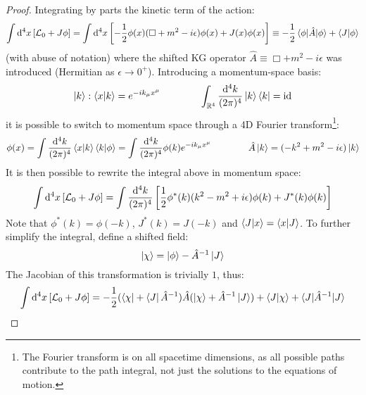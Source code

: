 \begin{proofbox}
  \begin{proof}
    Integrating by parts the kinetic term of the action:
    \begin{equation*}
      \int \mathrm{d}^4x \left[ \mathcal{L}_0 + J \phi \right] = \int \mathrm{d}^4x \left[ - \frac{1}{2} \phi(x) (\Box + m^2 - i\epsilon) \phi(x) + J(x) \phi(x) \right] \equiv - \frac{1}{2} \braket{\phi | \hat{A} | \phi} + \braket{J | \phi}
    \end{equation*}
    (with abuse of notation) where the shifted KG operator $ \hat{A} \equiv \Box + m^2 - i\epsilon $ was introduced (Hermitian as $ \epsilon \rightarrow 0^+ $). Introducing a momentum-space basis:
    \begin{equation}
      \ket{k} : \braket{x | k} = e^{-i k_\mu x^\mu}
      \qquad \qquad
      \int_{\mathbb{R}^4} \frac{\mathrm{d}^4k}{(2\pi)^4} \ket{k} \bra{k} = \operatorname{id}
    \end{equation}
    it is possible to switch to momentum space through a 4D Fourier transform\footnote{The Fourier transform is on all spacetime dimensions, as all possible paths contribute to the path integral, not just the solutions to the equations of motion.}:
    \begin{equation*}
      \phi(x) = \int \frac{\mathrm{d}^4k}{(2\pi)^4} \braket{x | k} \braket{k | \phi} = \int \frac{\mathrm{d}^4k}{(2\pi)^4} \phi(k) e^{-i k_\mu x^\mu}
      \qquad \qquad
      \hat{A} \ket{k} = (-k^2 + m^2 - i\epsilon) \ket{k}
    \end{equation*}
    It is then possible to rewrite the integral above in momentum space:
    \begin{equation*}
      \int \mathrm{d}^4x \left[ \mathcal{L}_0 + J \phi \right] = \int \frac{\mathrm{d}^4k}{(2\pi)^4} \left[ \frac{1}{2} \phi^*(k) (k^2 - m^2 + i\epsilon) \phi(k) + J^*(k) \phi(k) \right]
    \end{equation*}
    Note that $ \phi^*(k) = \phi(-k) $, $ J^*(k) = J(-k) $ and $ \braket{J|x} = \braket{x|J} $. To further simplify the integral, define a shifted field:
    \begin{equation*}
      \ket{\chi} = \ket{\phi} - \hat{A}^{-1} \ket{J}
    \end{equation*}
    The Jacobian of this transformation is trivially $ 1 $, thus:
    \begin{equation*}
      \begin{split}
        \int \dd^4x \left[ \lag_0 + J\phi \right]
        & = - \frac{1}{2} (\bra{\chi} + \bra{J} \hat{A}^{-1}) \hat{A} (\ket{\chi} + \hat{A}^{-1} \ket{J}) + \braket{J | \chi} + \braket{J | \hat{A}^{-1} | J} \\

\end{split}
\end{equation*}
\end{proof}
\end{proofbox}
